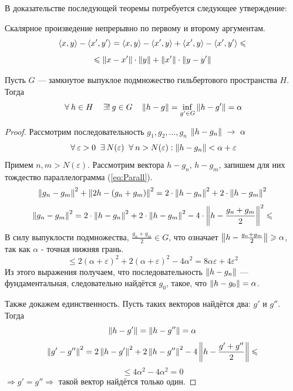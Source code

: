 \documentclass[12pt]{article}
\begin{document}
			В доказательстве последующей теоремы потребуется следующее утверждение:
			\begin{state}
				Скалярное произведение непрерывно по первому и второму аргументам.
				$$\left\langle x, y \right\rangle - \left\langle x', y' \right\rangle = \left\langle x, y \right\rangle - \left\langle x', y \right\rangle + \left\langle x', y \right\rangle - \left\langle x', y' \right\rangle \leqslant$$
				$$\leqslant \left\| x - x' \right\|\cdot \left\| y \right\| + \left\| x' \right\| \cdot \left\| y - y' \right\|$$
			\end{state}

			\begin{theorem}
				Пусть $G$ --- замкнутое выпуклое подмножество гильбертового пространства $H$. Тогда
				$$\forall h \in H \quad \existsonly g \in G \quad \norm{h-g} = \underset{g' \in G}{\inf} \norm{h-g'} = \alpha$$
			\end{theorem}
			\begin{proof}
				Рассмотрим последовательность $g_1, g_2, ..., g_n$ $\left\| h - g_n \right\|~\rightarrow~\alpha$
				$$\forall \varepsilon > 0 ~ \exists N(\varepsilon) ~ \forall n > N(\varepsilon): \norm{h - g_n} < \alpha + \varepsilon$$
				Примем $n, m > N(\varepsilon)$. Рассмотрим вектора $h - g_n$, $h - g_m$, запишем для них тождество параллелограмма 
				(\ref{eq:Parall}).
				$$\left\| g_n - g_m \right\|^2 + \left\| 2h - (g_n + g_m) \right\|^2 = 2 \cdot \left\| h - g_n \right\|^2 + 2 \cdot \left\| h - g_m \right\|^2$$
				$$\left\| g_n - g_m \right\|^2 = 2 \cdot \left\| h - g_n \right\|^2 + 2 \cdot \left\| h - g_m \right\|^2 - 4 \cdot \left\| h - \frac{g_n + g_m}{2} \right\|^2 \leqslant$$
				В силу выпуклости подмножества, $\frac{g_n + g_m}{2} \in G$, что означает $\left\| h - \frac{g_n + g_m}{2} \right\| \geqslant \alpha$, так
				как $\alpha$ - точная нижняя грань.
				$$\leq 2 (\alpha + \varepsilon)^2 + 2 (\alpha + \varepsilon)^2 - 4 \alpha^2 = 8 \alpha \varepsilon + 4 \varepsilon^2$$
				Из этого выражения получаем, что последовательность $\left\| h - g_n \right\|$ --- фундаментальная, следовательно найдётся $g_0$, 
				такое, что $\left\| h - g_0 \right\| = \alpha$.
		
				Также докажем единственность. Пусть таких векторов найдётся два: $g'$ и $g''$. Тогда
				$$\left\| h - g' \right\| = \left\| h - g'' \right\| = \alpha$$
				$$\left\| g' - g'' \right\|^2 = 2 \left\| h - g' \right\|^2 + 2 \left\| h - g'' \right\|^2 - 4 \left\| h - \frac{g' + g''}{2} \right\| \leqslant$$
				$$\leq 4 \alpha^2 - 4 \alpha^2 = 0$$
				$\Rightarrow g' = g'' \Rightarrow$ такой вектор найдётся только один.
			\end{proof}
\end{document}
